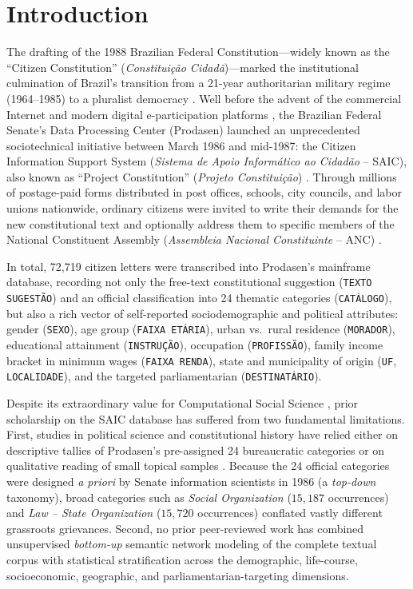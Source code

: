 \documentclass[pdflatex,sn-basic]{sn-jnl}
\begin{document}
\section{Introduction}\label{sec1}
The drafting of the 1988 Brazilian Federal Constitution---widely known as the ``Citizen Constitution'' (\textit{Constitui\c{c}\~{a}o Cidad\~{a}})---marked the institutional culmination of Brazil's transition from a 21-year authoritarian military regime (1964--1985) to a pluralist democracy \citep{souza2008regras,mcdonald2022making}. Well before the advent of the commercial Internet and modern digital e-participation platforms \citep{stieglitz2013social,pogrebinschi2014impact}, the Brazilian Federal Senate's Data Processing Center (Prodasen) launched an unprecedented sociotechnical initiative between March 1986 and mid-1987: the Citizen Information Support System (\textit{Sistema de Apoio Inform\'{a}tico ao Cidad\~{a}o} -- SAIC), also known as ``Project Constitution'' (\textit{Projeto Constitui\c{c}\~{a}o}) \citep{mcdonald2022making,santos2024lazer}. Through millions of postage-paid forms distributed in post offices, schools, city councils, and labor unions nationwide, ordinary citizens were invited to write their demands for the new constitutional text and optionally address them to specific members of the National Constituent Assembly (\textit{Assembleia Nacional Constituinte} -- ANC) \citep{montambeault2018constituicao,mcdonald2022making}.

In total, 72,719 citizen letters were transcribed into Prodasen's mainframe database, recording not only the free-text constitutional suggestion (\texttt{TEXTO SUGEST\~{A}O}) and an official classification into 24 thematic categories (\texttt{CAT\'{A}LOGO}), but also a rich vector of self-reported sociodemographic and political attributes: gender (\texttt{SEXO}), age group (\texttt{FAIXA ET\'{A}RIA}), urban vs.\ rural residence (\texttt{MORADOR}), educational attainment (\texttt{INSTRU\c{C}\~{A}O}), occupation (\texttt{PROFISS\~{A}O}), family income bracket in minimum wages (\texttt{FAIXA RENDA}), state and municipality of origin (\texttt{UF}, \texttt{LOCALIDADE}), and the targeted parliamentarian (\texttt{DESTINAT\'{A}RIO}).

Despite its extraordinary value for Computational Social Science \citep{lazer2009computational,grimmer2013text}, prior scholarship on the SAIC database has suffered from two fundamental limitations. First, studies in political science and constitutional history have relied either on descriptive tallies of Prodasen's pre-assigned 24 bureaucratic categories or on qualitative reading of small topical samples \citep{mcdonald2022making,santos2024lazer}. Because the 24 official categories were designed \textit{a priori} by Senate information scientists in 1986 (a \textit{top-down} taxonomy), broad categories such as \textit{Social Organization} ($15,187$ occurrences) and \textit{Law -- State Organization} ($15,720$ occurrences) conflated vastly different grassroots grievances. Second, no prior peer-reviewed work has combined unsupervised \textit{bottom-up} semantic network modeling of the complete textual corpus with statistical stratification across the demographic, life-course, socioeconomic, geographic, and parliamentarian-targeting dimensions.
\end{document}
